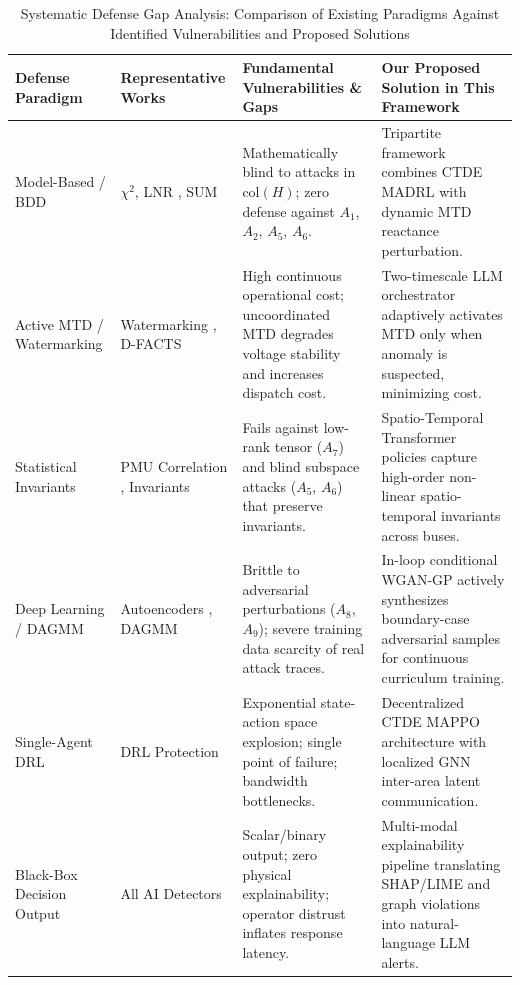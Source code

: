 \documentclass[journal,compsoc]{IEEEtran}
\begin{document}
\begin{table}[!t]
\centering
\caption{Systematic Defense Gap Analysis: Comparison of Existing Paradigms Against Identified Vulnerabilities and Proposed Solutions}
\label{tab:gaps}
\small
\begin{tabularx}{\textwidth}{l p{3.2cm} p{4.5cm} p{5.5cm}}
\toprule
\textbf{Defense Paradigm} & \textbf{Representative Works} & \textbf{Fundamental Vulnerabilities \& Gaps} & \textbf{Our Proposed Solution in This Framework} \\
\midrule
Model-Based / BDD & $\chi^2$, LNR \cite{ref10}, SUM \cite{ref18} & Mathematically blind to attacks in $\text{col}(H)$; zero defense against $A_1$, $A_2$, $A_5$, $A_6$. & Tripartite framework combines CTDE MADRL with dynamic MTD reactance perturbation. \\
Active MTD / Watermarking & Watermarking \cite{ref4}, D-FACTS \cite{ref54, ref68} & High continuous operational cost; uncoordinated MTD degrades voltage stability and increases dispatch cost. & Two-timescale LLM orchestrator adaptively activates MTD only when anomaly is suspected, minimizing cost. \\
Statistical Invariants & PMU Correlation \cite{ref61}, Invariants \cite{ref42} & Fails against low-rank tensor ($A_7$) and blind subspace attacks ($A_5$, $A_6$) that preserve invariants. & Spatio-Temporal Transformer policies capture high-order non-linear spatio-temporal invariants across buses. \\
Deep Learning / DAGMM & Autoencoders \cite{ref66}, DAGMM \cite{ref40} & Brittle to adversarial perturbations ($A_8$, $A_9$); severe training data scarcity of real attack traces. & In-loop conditional WGAN-GP actively synthesizes boundary-case adversarial samples for continuous curriculum training. \\
Single-Agent DRL & DRL Protection \cite{ref34} & Exponential state-action space explosion; single point of failure; bandwidth bottlenecks. & Decentralized CTDE MAPPO architecture with localized GNN inter-area latent communication. \\
Black-Box Decision Output & All AI Detectors \cite{ref34, ref40, ref66} & Scalar/binary output; zero physical explainability; operator distrust inflates response latency. & Multi-modal explainability pipeline translating SHAP/LIME and graph violations into natural-language LLM alerts. \\
\bottomrule
\end{tabularx}
\end{table}
\end{document}

